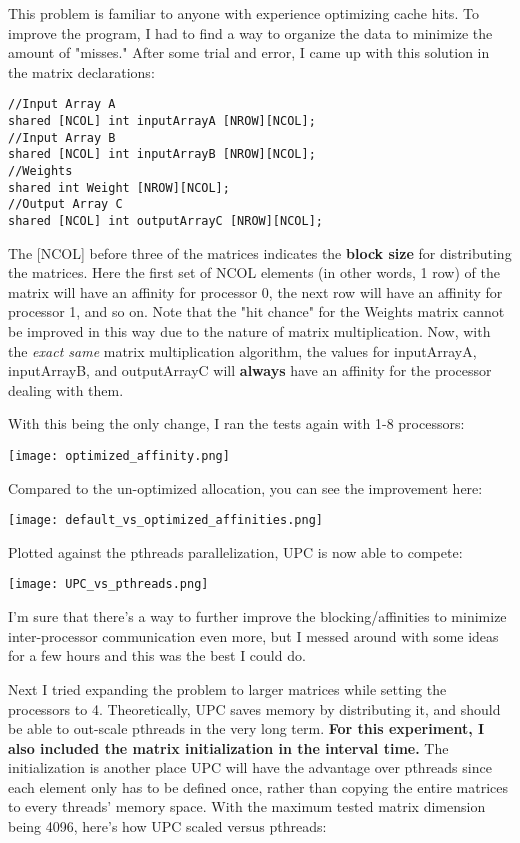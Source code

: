 \documentclass{article}
\begin{document}
This problem is familiar to anyone with experience optimizing cache hits. To improve the program, I had to find a way to organize the data to minimize the amount of "misses." After some trial and error, I came up with this solution in the matrix declarations: 


\begin{lstlisting}
//Input Array A
shared [NCOL] int inputArrayA [NROW][NCOL];
//Input Array B
shared [NCOL] int inputArrayB [NROW][NCOL];
//Weights
shared int Weight [NROW][NCOL];
//Output Array C
shared [NCOL] int outputArrayC [NROW][NCOL];
\end{lstlisting}

\noindent
The [NCOL] before three of the matrices indicates the \textbf{block size} for distributing the matrices. Here the first set of NCOL elements (in other words, 1 row) of the matrix will have an affinity for processor 0, the next row will have an affinity for processor 1, and so on. Note that the "hit chance" for the Weights matrix cannot be improved in this way due to the nature of matrix multiplication. Now, with the \emph{exact same} matrix multiplication algorithm, the values for inputArrayA, inputArrayB, and outputArrayC will \textbf{always} have an affinity for the processor dealing with them. 

With this being the only change, I ran the tests again with 1-8 processors:

\begin{center}
    \texttt{[image: optimized\_affinity.png]}
\end{center}

\noindent 
Compared to the un-optimized allocation, you can see the improvement here:

\begin{center}
    \texttt{[image: default\_vs\_optimized\_affinities.png]}
\end{center}

\noindent 
Plotted against the pthreads parallelization, UPC is now able to compete:

\begin{center}
    \texttt{[image: UPC\_vs\_pthreads.png]}
\end{center}

\noindent
I'm sure that there's a way to further improve the blocking/affinities to minimize inter-processor communication even more, but I messed around with some ideas for a few hours and this was the best I could do.

Next I tried expanding the problem to larger matrices while setting the processors to 4. Theoretically, UPC saves memory by distributing it, and should be able to out-scale pthreads in the very long term. \textbf{For this experiment, I also included the matrix initialization in the interval time.} The initialization is another place UPC will have the advantage over pthreads since each element only has to be defined once, rather than copying the entire matrices to every threads' memory space. With the maximum tested matrix dimension being 4096, here's how UPC scaled versus pthreads:
\end{document}
